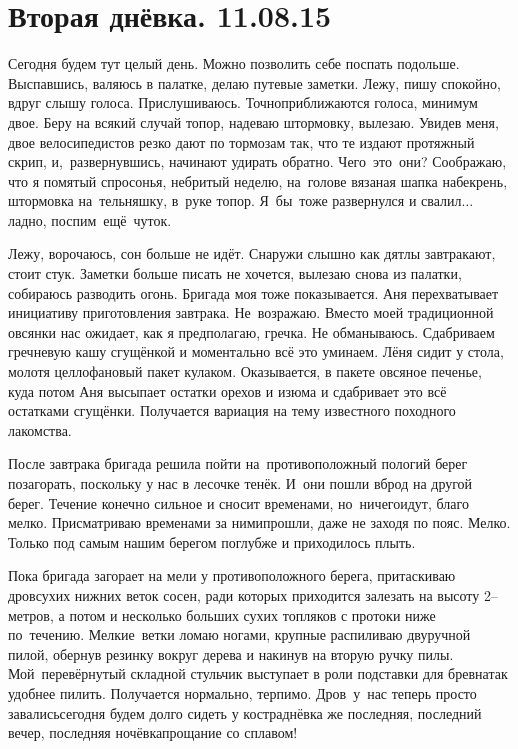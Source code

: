 \chapter{Вторая днёвка. 11.08.15}

Сегодня будем тут целый день. Можно позволить себе поспать подольше. Выспавшись, валяюсь в палатке, делаю путевые заметки. Лежу, пишу спокойно, вдруг слышу голоса. Прислушиваюсь. Точно\mdash приближаются голоса, минимум двое. Беру на всякий случай топор, надеваю штормовку, вылезаю. Увидев меня, двое велосипедистов резко дают по тормозам так, что те издают протяжный скрип, и,~развернувшись, начинают удирать обратно. Чего~это~они? Соображаю, что я помятый спросонья, небритый неделю, на~голове вязаная шапка набекрень, штормовка на~тельняшку, в~руке топор. Я~бы~тоже развернулся и свалил$\ldots$ ладно, поспим~ещё~чуток. 

Лежу, ворочаюсь, сон больше не идёт. Снаружи слышно как дятлы завтракают, стоит стук. Заметки больше писать не хочется, вылезаю снова из палатки, собираюсь разводить огонь. Бригада моя тоже показывается. Аня перехватывает инициативу приготовления завтрака. Не~возражаю. Вместо моей традиционной овсянки нас ожидает, как я предполагаю, гречка. Не обманываюсь. Сдабриваем гречневую кашу сгущёнкой и моментально всё это уминаем. Лёня сидит у стола, молотя целлофановый пакет кулаком. Оказывается, в пакете овсяное печенье, куда потом Аня высыпает остатки орехов и изюма и сдабривает это всё остатками сгущёнки. Получается вариация на тему известного походного лакомства.

После завтрака бригада решила пойти на~противоположный пологий берег позагорать, поскольку у нас в лесочке тенёк. И~они пошли вброд на другой берег. Течение конечно сильное и сносит временами, но~ничего\mdash идут, благо мелко. Присматриваю временами за ними\mdash прошли, даже не заходя по пояс. Мелко. Только под самым нашим берегом поглубже и приходилось плыть. 

Пока бригада загорает на мели у противоположного берега, притаскиваю дров\mdash сухих нижних веток сосен, ради которых приходится залезать на высоту 2\thinspace\nobreakdash-- метров, а потом и несколько больших сухих топляков с протоки ниже по~течению. Мелкие~ветки ломаю ногами, крупные распиливаю двуручной пилой, обернув резинку вокруг дерева и накинув на вторую ручку пилы. Мой~перевёрнутый складной стульчик выступает в роли подставки для бревна\mdash так удобнее пилить. Получается нормально, терпимо. Дров~у~нас теперь просто завались\mdash сегодня будем долго сидеть у костра\mdash днёвка же последняя, последний вечер, последняя ночёвка\mdash прощание со сплавом! 

